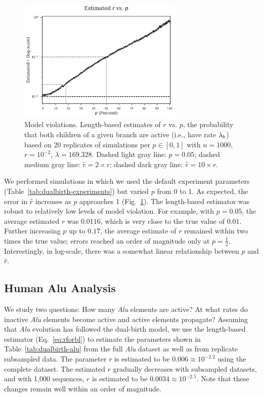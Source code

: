 \begin{figure} %
\centering
\includegraphics[width=0.7\textwidth]{figs/dualbirth-model-violations}
\caption[Model Violations]
{Model violations. Length-based estimates of $r$ vs. $p$, the probability that both children of a given branch are active (i.e., have rate $\lambda_b$) based on 20 replicates of simulations per $p\in[0,1]$ with $n=1000$, $r=10^{-2}$, $\lambda=169.328$. Dashed light gray line: $p=0.05$; dashed medium gray line: $\hat{r}=2\times r$; dashed dark gray line: $\hat{r}=10\times r$.}
\label{fig:dualbirth-model-violations}
\end{figure}

We performed simulations in which we used the default experiment parameters (Table~\ref{tab:dualbirth-experiments}) but varied $p$ from 0 to 1. As expected, the error in $\hat{r}$ increases as $p$ approaches 1 (Fig.~\ref{fig:dualbirth-model-violations}). The length-based estimator was  robust to relatively low levels of model violation. For example, with $p=0.05$, the average estimated $r$ was $0.0116$, which is very close to the true value of $0.01$. Further increasing $p$ up to $0.17$, the average estimate of $r$ remained within two times the true value; errors reached an order of magnitude only at $p=\frac{1}{2}$. Interestingly, in log-scale, there was a somewhat linear relationship between $p$ and $\hat{r}$.

\subsection{Human Alu Analysis}\label{sec:dualbirth-human-alu-analyses}
We study two questions: How many {\em Alu} elements are active? At what rates do inactive {\em Alu} elements become active and active elements propagate? Assuming that {\em Alu} evolution has followed the dual-birth model, we use the length-based estimator (Eq.~\ref{eq:rforbl}) to estimate the parameters shown in Table~\ref{tab:dualbirth-alu} from the full {\em Alu} dataset as well as from replicate subsampled data. The parameter $r$ is estimated to be $0.006\approx10^{-2.2}$ using the complete dataset. The estimated $r$ gradually decreases with subsampled datasets, and with 1,000 sequences, $r$ is estimated to be $0.0034\approx10^{-2.5}$. Note that these changes remain well within an order of magnitude.

